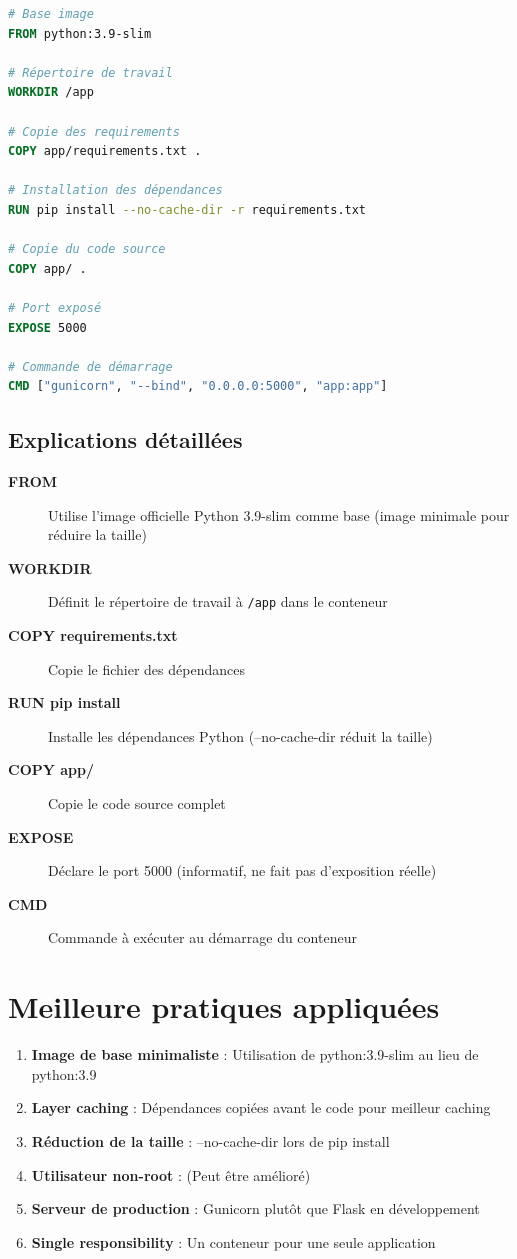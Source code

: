 \documentclass[12pt,a4paper,twoside]{report}
\begin{document}
\begin{lstlisting}[language=dockerfile]
# Base image
FROM python:3.9-slim

# Répertoire de travail
WORKDIR /app

# Copie des requirements
COPY app/requirements.txt .

# Installation des dépendances
RUN pip install --no-cache-dir -r requirements.txt

# Copie du code source
COPY app/ .

# Port exposé
EXPOSE 5000

# Commande de démarrage
CMD ["gunicorn", "--bind", "0.0.0.0:5000", "app:app"]
\end{lstlisting}

\subsection{Explications détaillées}

\begin{description}
    \item[\textbf{FROM}] Utilise l'image officielle Python 3.9-slim comme base (image minimale pour réduire la taille)
    \item[\textbf{WORKDIR}] Définit le répertoire de travail à \texttt{/app} dans le conteneur
    \item[\textbf{COPY requirements.txt}] Copie le fichier des dépendances
    \item[\textbf{RUN pip install}] Installe les dépendances Python (--no-cache-dir réduit la taille)
    \item[\textbf{COPY app/}] Copie le code source complet
    \item[\textbf{EXPOSE}] Déclare le port 5000 (informatif, ne fait pas d'exposition réelle)
    \item[\textbf{CMD}] Commande à exécuter au démarrage du conteneur
\end{description}

\section{Meilleure pratiques appliquées}

\begin{enumerate}
    \item \textbf{Image de base minimaliste} : Utilisation de python:3.9-slim au lieu de python:3.9
    \item \textbf{Layer caching} : Dépendances copiées avant le code pour meilleur caching
    \item \textbf{Réduction de la taille} : --no-cache-dir lors de pip install
    \item \textbf{Utilisateur non-root} : (Peut être amélioré)
    \item \textbf{Serveur de production} : Gunicorn plutôt que Flask en développement
    \item \textbf{Single responsibility} : Un conteneur pour une seule application
\end{enumerate}
\end{document}
